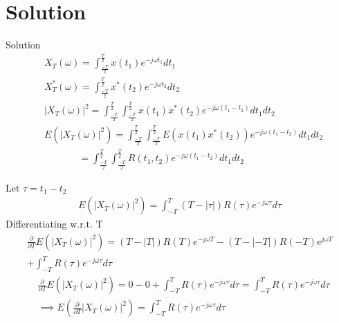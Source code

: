 \documentclass{beamer}
\providecommand{\brak}[1]{\ensuremath{\left(#1\right)}}
\theoremstyle{remark}
\numberwithin{equation}{section}
\numberwithin{figure}{section}
\numberwithin{table}{section}
\begin{document}
\section{Solution} 
\begin{frame}{Solution} 
  \begin{align}
  &X_T(\omega) = \int^{\frac{T}{2}}_{\frac{-T}{2}} x(t_1)e^{-j\omega t_1} dt_1\\
  &X_T^*(\omega) = \int^{\frac{T}{2}}_{\frac{-T}{2}} x^*(t_2)e^{-j\omega t_2} dt_2\\
  &|X_T(\omega)|^2 = \int^{\frac{T}{2}}_{\frac{-T}{2}} \int^{\frac{T}{2}}_{\frac{-T}{2}} x(t_1)x^*(t_2)e^{-j\omega (t_1-t_2)} dt_1 dt_2\\
  &E(|X_T(\omega)|^2) = \int^{\frac{T}{2}}_{\frac{-T}{2}} \int^{\frac{T}{2}}_{\frac{-T}{2}} E(x(t_1)x^*(t_2))e^{-j\omega (t_1-t_2)} dt_1 dt_2\\
  &~~~~~~~~~~~~~~~~= \int^{\frac{T}{2}}_{\frac{-T}{2}} \int^{\frac{T}{2}}_{\frac{-T}{2}} R(t_1,t_2)e^{-j\omega (t_1-t_2)} dt_1 dt_2
\end{align}
\end{frame}
\begin{frame}
Let $ \tau = t_1 - t_2$
\begin{align}
  E(|X_T(\omega)|^2) =  \int^{T}_{-T} (T-|\tau|)R(\tau)e^{-j\omega \tau} d\tau
\end{align}
Differentiating w.r.t. T 
\begin{multline}
  \frac{\partial}{\partial T}E(|X_T(\omega)|^2) =  (T-|T|)R(T)e^{-j\omega T} - (T-|-T|)R(-T)e^{j\omega T} \\+ \int^{T}_{-T} R(\tau)e^{-j\omega \tau} d\tau
\end{multline}
\begin{align}
  &\frac{\partial}{\partial T}E(|X_T(\omega)|^2) = 0 - 0 + \int^{T}_{-T} R(\tau)e^{-j\omega \tau} d\tau = \int^{T}_{-T} R(\tau)e^{-j\omega \tau} d\tau\\
  &\implies E\brak{\frac{\partial}{\partial T}|X_T(\omega)|^2} = \int^{T}_{-T} R(\tau)e^{-j\omega \tau} d\tau
\end{align}
\end{frame}
\end{document}
